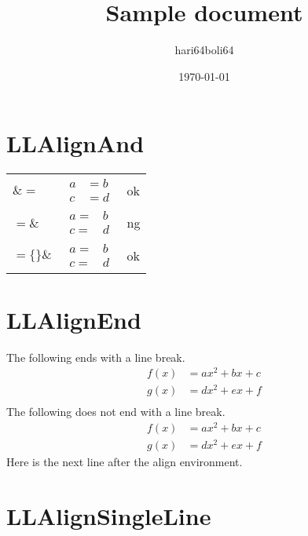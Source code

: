 \documentclass[a4paper, 10pt]{article}
\newcommand{\tA}[1]{\textcolor{cA}{#1}}
\newcommand{\tD}[1]{\textcolor{cD}{#1}}
\begin{document}
\title{Sample document}
\author{hari64boli64}
\date{\today}
\maketitle

\section{LLAlignAnd}

\begin{table}[H]
	\centering
	\begin{tabular}{lll}
		$\&=$            &
		$\begin{aligned}
				 a & = b \\
				 c & = d
			 \end{aligned}$ &
		\tA{ok}            \\[0.3cm]
		$=\&$            &
		$\begin{aligned}
				 a = & b \\
				 c = & d
			 \end{aligned}$ &
		\tD{ng}            \\[0.3cm]
		$=\{\}\&$        &
		$\begin{aligned}
				 a = {} & b \\
				 c = {} & d
			 \end{aligned}$ &
		\tA{ok}
	\end{tabular}
\end{table}

\section{LLAlignEnd}

The following ends with a line break.
\begin{align*}
	f(x) & = ax^2 + bx + c \\
	g(x) & = dx^2 + ex + f \\
\end{align*}
The following does not end with a line break.
\begin{align*}
	f(x) & = ax^2 + bx + c \\
	g(x) & = dx^2 + ex + f
\end{align*}
Here is the next line after the align environment.

\section{LLAlignSingleLine}
\end{document}
